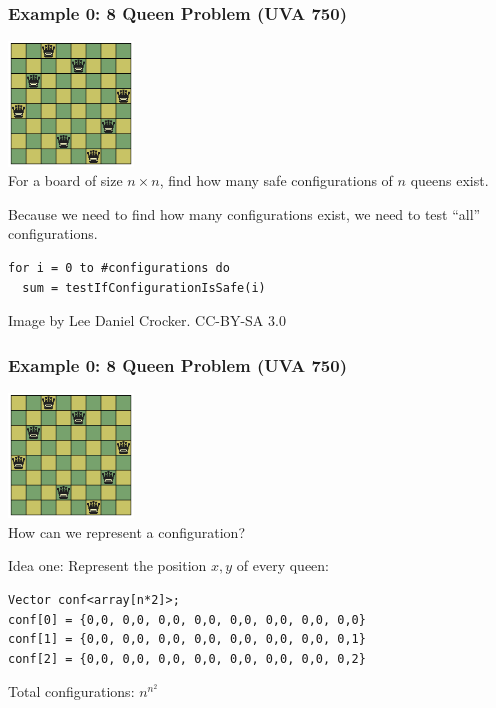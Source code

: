 \documentclass{beamer}
\begin{document}
\begin{frame}[fragile]
  \frametitle{Example 0: 8 Queen Problem (UVA 750)}
  \includegraphics[width=0.25\textwidth]{../img/8queen}\\

  For a board of size $n \times n$, find \alert{how many} safe
  configurations of $n$ queens exist.

  \bigskip

  Because we need to find \alert{how many} configurations exist,
  we need to test ``all'' configurations.

  \bigskip
  
\begin{verbatim}
for i = 0 to #configurations do
  sum = testIfConfigurationIsSafe(i)
\end{verbatim}

  {\tiny\hfill Image by Lee Daniel Crocker. CC-BY-SA 3.0}
\end{frame}

\begin{frame}[fragile]
  \frametitle{Example 0: 8 Queen Problem (UVA 750)}

  \includegraphics[width=0.25\textwidth]{../img/8queen}\\

  How can we represent a configuration?

  \bigskip

  Idea one: Represent the position $x,y$ of every queen:

  \bigskip
  
\begin{verbatim}
Vector conf<array[n*2]>;
conf[0] = {0,0, 0,0, 0,0, 0,0, 0,0, 0,0, 0,0, 0,0}
conf[1] = {0,0, 0,0, 0,0, 0,0, 0,0, 0,0, 0,0, 0,1}
conf[2] = {0,0, 0,0, 0,0, 0,0, 0,0, 0,0, 0,0, 0,2}
\end{verbatim}

Total configurations: $n^{n^2}$
\end{frame}
\end{document}
